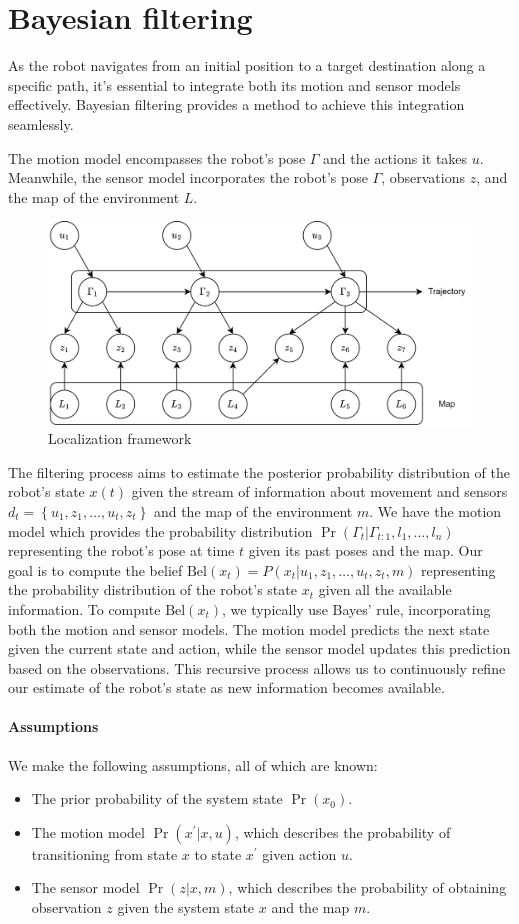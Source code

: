 \section{Bayesian filtering}

As the robot navigates from an initial position to a target destination along a specific path, it's essential to integrate both its motion and sensor models effectively. 
Bayesian filtering provides a method to achieve this integration seamlessly.

The motion model encompasses the robot's pose $\Gamma$ and the actions it takes $u$. 
Meanwhile, the sensor model incorporates the robot's pose $\Gamma$, observations $z$, and the map of the environment $L$. 
\begin{figure}[H]
    \centering
    \includegraphics[width=0.75\linewidth]{images/slam.png}
    \caption{Localization framework}
\end{figure}
The filtering process aims to estimate the posterior probability distribution of the robot's state $x(t)$ given the stream of information about movement and sensors 
$d_t=\left\{u_1,z_1,\dots,u_t,z_t\right\}$ and the map of the environment $m$.
We have the motion model which provides the probability distribution $\Pr(\Gamma_t|\Gamma_{t:1},l_1,\dots,l_n)$ representing the robot's pose at time $t$ given its past poses and the map.
Our goal is to compute the belief $\text{Bel}(x_t)=P(x_t|u_1,z_1,\dots,u_t,z_t,m)$ representing the probability distribution of the robot's state $x_t$ given all the available information.
To compute $\text{Bel}(x_t)$, we typically use Bayes' rule, incorporating both the motion and sensor models. The motion model predicts the next state given the current state and action, while the sensor model updates this prediction based on the observations. This recursive process allows us to continuously refine our estimate of the robot's state as new information becomes available.

\paragraph*{Assumptions}
We make the following assumptions, all of which are known:
\begin{itemize}
    \item The prior probability of the system state $\Pr(x_0)$. 
    \item The motion model $\Pr(x^\prime|x, u)$, which describes the probability of transitioning from state $x$ to state $x^\prime$ given action $u$.
    \item The sensor model $\Pr(z|x, m)$, which describes the probability of obtaining observation $z$ given the system state $x$ and the map $m$.
\end{itemize}

